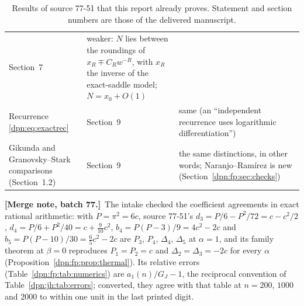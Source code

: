 \documentclass[11pt]{article}
\numberwithin{equation}{section}
\theoremstyle{definition}\newtheorem{definition}[theorem]{Definition}
\theoremstyle{remark}\newtheorem{remark}[theorem]{Remark}
\newcommand{\mergenotec}[1]{\par\smallskip\noindent\textbf{[Merge note, batch 77.]}\ #1\par\smallskip}
\begin{document}
\begin{table}[!htbp]
\begin{tabular}{>{\raggedright\arraybackslash}p{4.2cm}>{\raggedright\arraybackslash}p{4.0cm}>{\raggedright\arraybackslash}p{5.6cm}}
 Section~7 & weaker: $N$ lies between the roundings of $x_R\mp C_Rw^{-R}$,
 with $x_R$ the inverse of the exact-saddle model; $N=x_0+O(1)$\\
Recurrence \eqref{dpn:eq:exactrec} & Section~9 & same (an ``independent
 recurrence uses logarithmic differentiation'')\\
Gikunda and Granovsky--Stark comparisons (Section~1.2) & Section~9 & the same
 distinctions, in other words; Naranjo--Ram\'irez is new
 (Section~\ref{dpn:fp:sec:checks})\\
\bottomrule
\end{tabular}
\caption{Results of source 77-51 that this report already proves.  Statement
and section numbers are those of the delivered manuscript.}\label{dpn:fp:tab:dup}
\end{table}

\mergenotec{The intake checked the coefficient agreements in exact rational
arithmetic: with $P=\pi^2=6c$, source 77-51's $d_3=P/6-P^2/72=c-c^2/2$,
$d_4=P/6+P^2/40=c+\frac9{10}c^2$, $b_4=P(P-3)/9=4c^2-2c$ and
$b_5=P(P-10)/30=\frac65c^2-2c$ are $P_3$, $P_4$, $\Delta_4$, $\Delta_5$ at
$\alpha=1$, and its family theorem at $\beta=0$ reproduces $P_1=P_2=c$ and
$\Delta_2=\Delta_3=-2c$ for every $\alpha$ (Proposition~\ref{dpn:fp:prop:thermal}).
Its relative errors (Table~\ref{dpn:fp:tab:numerics}) are $a_1(n)/G_J-1$,
the reciprocal convention of Table~\ref{dpn:jh:tab:errors}; converted, they
agree with that table at $n=200$, $1000$ and $2000$ to within one unit in the last printed digit.}
\end{document}
